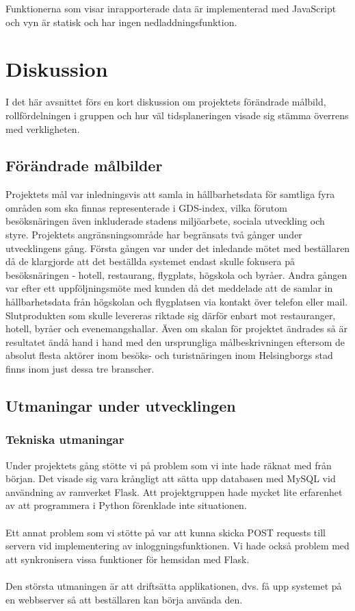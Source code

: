 \documentclass[12pt]{article}
\begin{document}
Funktionerna som visar inrapporterade data är implementerad med JavaScript och vyn är statisk och har ingen nedladdningsfunktion.
\newpage
\section{Diskussion}
I det här avsnittet förs en kort diskussion om projektets förändrade målbild, rollfördelningen i gruppen och hur väl tidsplaneringen visade sig stämma överrens med verkligheten.
\subsection{Förändrade målbilder}

Projektets mål var inledningsvis att samla in hållbarhetsdata för samtliga fyra områden som ska finnas representerade i GDS-index, vilka förutom besöksnäringen även inkluderade stadens miljöarbete, sociala utveckling och styre. Projektets angränsningsområde har begränsats två gånger under utvecklingens gång. Första gången var under det inledande mötet med beställaren då de klargjorde att det beställda systemet endast skulle fokusera på besöksnäringen - hotell, restaurang, flygplats, högskola och byråer. Andra gången var efter ett uppföljningsmöte med kunden då det meddelade att de samlar in hållbarhetsdata från högskolan och flygplatsen via kontakt över telefon eller mail. Slutprodukten som skulle levereras riktade sig därför enbart mot restauranger, hotell, byråer och evenemangshallar. Även om skalan för projektet ändrades så är resultatet ändå hand i hand med den ursprungliga målbeskrivningen eftersom de absolut flesta aktörer inom besöks- och turistnäringen inom Helsingborgs stad finns inom just dessa tre branscher.


\subsection{Utmaningar under utvecklingen}

\subsubsection{Tekniska utmaningar}
Under projektets gång stötte vi på problem som vi inte hade räknat med från början. Det visade sig vara krångligt att sätta upp databasen med MySQL vid användning av ramverket Flask. Att projektgruppen hade mycket lite erfarenhet av att programmera i Python förenklade inte situationen.\\\\
Ett annat problem som vi stötte på var att kunna skicka POST requests till servern vid implementering av inloggningsfunktionen. Vi hade också problem med att synkronisera vissa funktioner för hemsidan med Flask.\\\\
Den största utmaningen är att driftsätta applikationen, dvs. få upp systemet på en webbserver så att beställaren kan börja använda den.
\end{document}
